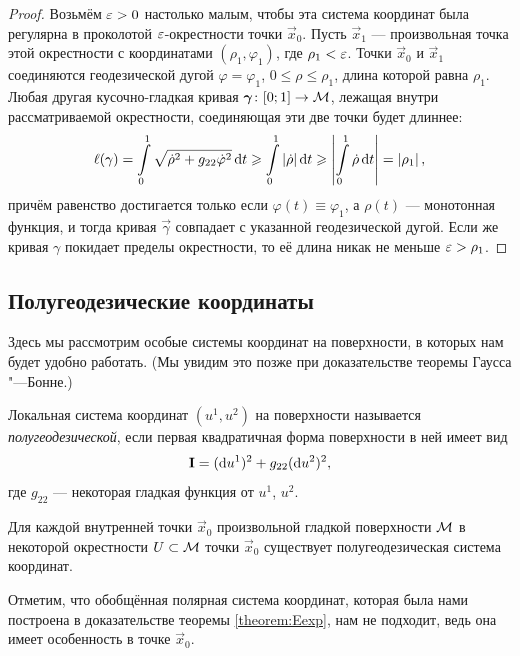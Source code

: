 \begin{proof}
	Возьмём $\varepsilon > 0$ настолько малым, чтобы эта система координат была регулярна в проколотой $\varepsilon$-окрестности точки $\vec{x}_0$. Пусть $\vec{x}_1$ --- произвольная точка этой окрестности с координатами $(\rho_1, \varphi_1)$, где $\rho_1 < \varepsilon$. Точки $\vec{x}_0$ и $\vec{x}_1$ соединяются геодезической дугой $\varphi = \varphi_1$, $0 \leqslant \rho \leqslant \rho_1$, длина которой равна $\rho_1$. Любая другая кусочно-гладкая кривая $\boldsymbol{\gamma}\colon [0; 1] \to \mathcal{M}$, лежащая внутри рассматриваемой окрестности, соединяющая эти две точки будет длиннее:
	\[
		\ell(\gamma) = \int\limits_0^1\sqrt{\dot{\rho}^2 + g_{22}\dot{\varphi}^2}\mathop{}\!\mathrm{d} t \geqslant \int\limits_0^1\left\lvert\dot{\rho}\right\rvert\mathop{}\!\mathrm{d} t \geqslant \left\lvert\int\limits_0^1\dot{\rho}\mathop{}\!\mathrm{d} t\right\rvert = \left\lvert\rho_1\right\rvert,
	\]
	причём равенство достигается только если $\varphi(t) \equiv \varphi_1$, а $\rho(t)$ --- монотонная функция, и тогда кривая $\vec{\gamma}$ совпадает с указанной геодезической дугой. Если же кривая $\gamma$ покидает пределы окрестности, то её длина никак не меньше $\varepsilon > \rho_1$.
\end{proof}

\subsection{Полугеодезические координаты}

Здесь мы рассмотрим особые системы координат на поверхности, в которых нам будет удобно работать. (Мы увидим это позже при доказательстве теоремы Гаусса "---Бонне.)

\begin{definition}
	Локальная система координат $(u^1, u^2)$ на поверхности называется \textit{полугеодезической}, если первая квадратичная форма поверхности в ней имеет вид
	\[
		\boldsymbol{\operatorname{I}} = (\mathop{}\!\mathrm{d} u^1)^2 + g_{22}(\mathop{}\!\mathrm{d} u^2)^2,
	\]
	где $g_{22}$ --- некоторая гладкая функция от $u^1$, $u^2$.
\end{definition}

\begin{theorem} \label{theorem:EHalfgeodesic}
	Для каждой внутренней точки $\vec{x}_0$ произвольной гладкой поверхности $\mathcal{M}$ в некоторой окрестности $U \subset \mathcal{M}$ точки $\vec{x}_0$ существует полугеодезическая система координат.
\end{theorem}

Отметим, что обобщённая полярная система координат, которая была нами построена в доказательстве теоремы \ref{theorem:Eexp}, нам не подходит, ведь она имеет особенность в точке $\vec{x}_0$.

